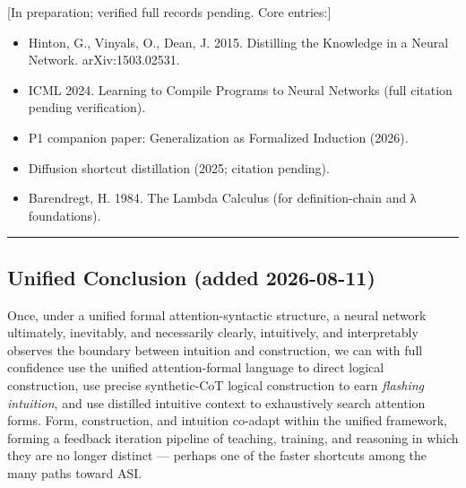 \documentclass[
]{article}
\providecommand{\tightlist}{%
  \setlength{\itemsep}{0pt}\setlength{\parskip}{0pt}}
\begin{document}
{[}In preparation; verified full records pending. Core entries:{]}

\begin{itemize}
\tightlist
\item
  Hinton, G., Vinyals, O., Dean, J. 2015. Distilling the Knowledge in a
  Neural Network. arXiv:1503.02531.
\item
  ICML 2024. Learning to Compile Programs to Neural Networks (full
  citation pending verification).
\item
  P1 companion paper: Generalization as Formalized Induction (2026).
\item
  Diffusion shortcut distillation (2025; citation pending).
\item
  Barendregt, H. 1984. The Lambda Calculus (for definition-chain and λ
  foundations).
\end{itemize}

\begin{center}\rule{0.5\linewidth}{0.5pt}\end{center}

\subsection{Unified Conclusion (added
2026-08-11)}\label{unified-conclusion-added-2026-08-11}

Once, under a unified formal attention-syntactic structure, a neural
network ultimately, inevitably, and necessarily clearly, intuitively,
and interpretably observes the boundary between intuition and
construction, we can with full confidence use the unified
attention-formal language to direct logical construction, use precise
synthetic-CoT logical construction to earn \emph{flashing intuition},
and use distilled intuitive context to exhaustively search attention
forms. Form, construction, and intuition co-adapt within the unified
framework, forming a feedback iteration pipeline of teaching, training,
and reasoning in which they are no longer distinct --- perhaps one of
the faster shortcuts among the many paths toward ASI.
\end{document}
